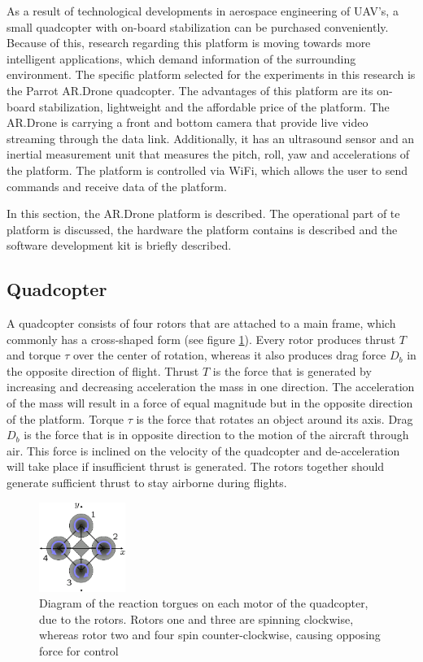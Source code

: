 \documentclass[a4paper]{article}
\begin{document}
As a result of technological developments in aerospace engineering of UAV's, a small quadcopter with on-board stabilization can be purchased conveniently. Because of this, research regarding this platform is moving towards more intelligent applications, which demand information of the surrounding environment. The specific platform selected for the experiments in this research is the Parrot AR.Drone quadcopter. The advantages of this platform are its on-board stabilization, lightweight and the affordable price of the platform. The AR.Drone is carrying a front and bottom camera that provide live video streaming through the data link. Additionally, it has an ultrasound sensor and an inertial measurement unit that measures the pitch, roll, yaw and accelerations of the platform. The platform is controlled via WiFi, which allows the user to send commands and receive data of the platform.

In this section, the AR.Drone platform is described. The operational part of te platform is discussed, the hardware the platform contains is described and the software development kit is briefly described.

\subsection{Quadcopter}
A quadcopter consists of four rotors that are attached to a main frame, which commonly has a cross-shaped form (see figure \ref{quadcopter}). Every rotor produces thrust $T$ and torque $\tau$ over the center of rotation, whereas it also produces drag force $D_b$ in the opposite direction of flight. Thrust $T$ is the force that is generated by increasing and decreasing acceleration the mass in one direction. The acceleration of the mass will result in a force of equal magnitude but in the opposite direction of the platform. Torque $\tau$ is the force that rotates an object around its axis. Drag $D_b$ is the force that is in opposite direction to the motion of the aircraft through air. This force is inclined on the velocity of the quadcopter and de-acceleration will take place if insufficient thrust is generated. The rotors together should generate sufficient thrust to stay airborne during flights.

\begin{figure}[!h]
	\centering
	\includegraphics[width=0.25\textwidth]{images/quadcopter.png}
	\caption{Diagram of the reaction torgues on each motor of the quadcopter, due to the rotors. Rotors one and three are spinning clockwise, whereas rotor two and four spin counter-clockwise, causing opposing force for control}
	\label{quadcopter}
\end{figure}
\end{document}
